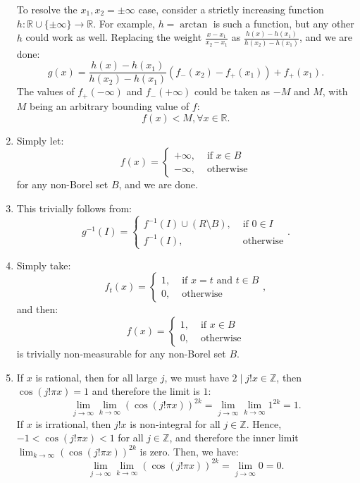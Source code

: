 \begin{enumerate}[label=\textbf{2B.\arabic*}]
  To resolve the \( x_{1}, x_{2} = \pm  \infty\) case, consider a strictly increasing
  function \( h: \mathbb{R} \cup \{\pm \infty\} \to \mathbb{R}  \). For example,
  \( h = \arctan  \) is such a function, but any other \( h \)
  could work as well. Replacing the weight \( \frac{x - x_{1}}{x_{2}-x_{1}}
  \) as \( \frac{h(x) - h(x_{1})}{h(x_{2}) - h(x_{1})} \), and we are done:
  \[
    g(x) = \frac{h(x) - h(x_{1})}{h(x_{2}) -
    h(x_{1})}(f_{-}(x_{2})-f_{+}(x_{1})) + f_{+}(x_{1})
  .\] 
  The values of \( f_{+}(-\infty) \) and \( f_{-}(+\infty) \) could be taken as
  \( -M \) and \( M \), with \( M \) being an arbitrary bounding value of \( f \):
  \[
    f(x) < M, \forall x \in \mathbb{R}
  .\] 

\item Simply let:
  \[
    f(x) = \begin{cases}
      +\infty, &\text{ if } x \in B\\
      -\infty, &\text{ otherwise}
    \end{cases}
  \] for any non-Borel set \( B \), and we are done.
\item This trivially follows from:
  \[
    g^{-1}(I) = \begin{cases}
      f^{-1}(I) \cup (R \setminus B), &\text{ if } 0 \in I\\
      f^{-1}(I), &\text{ otherwise}
    \end{cases}
  .\] 
\item Simply take:
  \[
    f_{t}(x) = \begin{cases}
      1, &\text{ if } x = t \text{ and } t \in B\\
      0, &\text{ otherwise}
    \end{cases}
  ,\] and then:
  \[
    f(x) = \begin{cases}
      1, &\text{ if } x \in B\\
      0, &\text{ otherwise}
    \end{cases}
  \] is trivially non-measurable for any non-Borel set \( B \).
\item If \( x \) is rational, then for all large \( j \), we must have \( 2 \mid
  j!x \in \mathbb{Z}\), then \( \cos (j!\pi x) = 1 \) and therefore the limit is
  \( 1 \):
  \[
    \lim_{j \to \infty} \lim_{k \to \infty} (\cos (j!\pi x))^{2k} = \lim_{j \to
    \infty} \lim_{k \to \infty} 1^{2k} = 1
  .\] 
  If \( x \) is irrational, then \( j!x \) is non-integral for all \( j \in
  \mathbb{Z} \). Hence, \( -1 < \cos (j!\pi x) < 1 \) for all \( j \in
  \mathbb{Z} \), and therefore the inner limit \( \lim_{k \to \infty} (\cos
  (j!\pi x))^{2k} \) is zero. Then, we have:
  \[
    \lim_{j \to \infty} \lim_{k \to \infty} (\cos (j!\pi x))^{2k} = \lim_{j \to
    \infty} 0 = 0
  .\] 
\end{enumerate}

